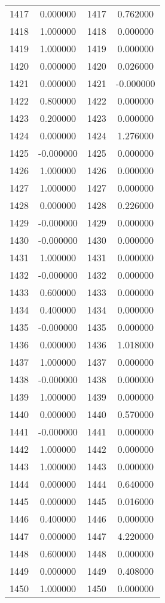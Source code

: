 \documentclass[12pt]{article}
\begin{document}
\begin{longtable}{@{}cccc@{}}
1417 & 0.000000 & 1417 & 0.762000 \\
1418 & 1.000000 & 1418 & 0.000000 \\
1419 & 1.000000 & 1419 & 0.000000 \\
1420 & 0.000000 & 1420 & 0.026000 \\
1421 & 0.000000 & 1421 & -0.000000 \\
1422 & 0.800000 & 1422 & 0.000000 \\
1423 & 0.200000 & 1423 & 0.000000 \\
1424 & 0.000000 & 1424 & 1.276000 \\
1425 & -0.000000 & 1425 & 0.000000 \\
1426 & 1.000000 & 1426 & 0.000000 \\
1427 & 1.000000 & 1427 & 0.000000 \\
1428 & 0.000000 & 1428 & 0.226000 \\
1429 & -0.000000 & 1429 & 0.000000 \\
1430 & -0.000000 & 1430 & 0.000000 \\
1431 & 1.000000 & 1431 & 0.000000 \\
1432 & -0.000000 & 1432 & 0.000000 \\
1433 & 0.600000 & 1433 & 0.000000 \\
1434 & 0.400000 & 1434 & 0.000000 \\
1435 & -0.000000 & 1435 & 0.000000 \\
1436 & 0.000000 & 1436 & 1.018000 \\
1437 & 1.000000 & 1437 & 0.000000 \\
1438 & -0.000000 & 1438 & 0.000000 \\
1439 & 1.000000 & 1439 & 0.000000 \\
1440 & 0.000000 & 1440 & 0.570000 \\
1441 & -0.000000 & 1441 & 0.000000 \\
1442 & 1.000000 & 1442 & 0.000000 \\
1443 & 1.000000 & 1443 & 0.000000 \\
1444 & 0.000000 & 1444 & 0.640000 \\
1445 & 0.000000 & 1445 & 0.016000 \\
1446 & 0.400000 & 1446 & 0.000000 \\
1447 & 0.000000 & 1447 & 4.220000 \\
1448 & 0.600000 & 1448 & 0.000000 \\
1449 & 0.000000 & 1449 & 0.408000 \\
1450 & 1.000000 & 1450 & 0.000000 \\

\end{longtable}
\end{document}
